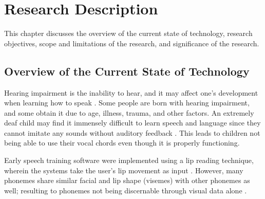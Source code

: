 \chapter{Research Description}
\label{sec:researchdesc}

This chapter discusses the overview of the current state of technology, research objectives, scope and limitations of the research, and significance of the research.

\section{Overview of the Current State of Technology}
\label{sec:overview}

Hearing impairment is the inability to hear, and it may affect one’s development when learning how to speak \cite{lasak:2014:HL}. Some people are born with hearing impairment, and some obtain it due to age, illness, trauma, and other factors. An extremely deaf child may find it immensely difficult to learn speech and language since they cannot imitate any sounds without auditory feedback \cite{bernstein:1988:STA}. This leads to children not being able to use their vocal chords even though it is properly functioning.

\begin{comment}
Throughout the years, man has tried to find ways to help the hearing-handicapped learn how to speak properly \cite{oyer:1976:CHH}. Oyer \citeyear{oyer:1976:CHH} states that there was a time when hearing-handicapped were considered unfit to hold citizenship. James Pickett, a professor of speech communication research says "I believe that large improvements in the lives of deaf persons depends on making large improvements in their speech communication" \cite{connor:1971:SDC}. Pickett also states that in the late 19th century, research began for helping the Deaf communicate \cite{connor:1971:SDC}.

One problem of a hearing-impaired student is the lack of access to speech training aids outside of therapy \cite{bernstein:1988:STA}. Extensive practice is required for the student to progress \cite{bernstein:1988:STA}.
\end{comment}

Early speech training software were implemented using a lip reading technique, wherein the systems take the user’s lip movement as input \cite{heracleous:2010:CSA}. However, many phonemes share similar facial and lip shape (visemes) with other phonemes as well; resulting to phonemes not being discernable through visual data alone \cite{heracleous:2010:CSA}.

